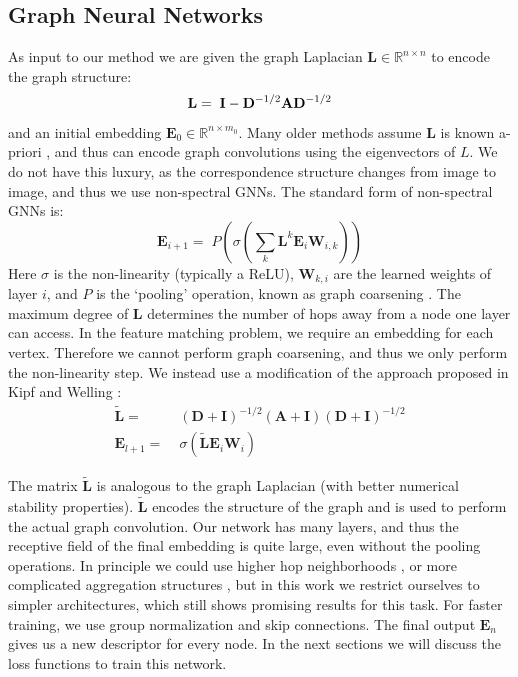\documentclass[10pt,twocolumn,letterpaper]{article}
\newcommand{\bR}{\mathbb{R}}
\newcommand{\mat}[1]{\mathbf{#1}}
\begin{document}
\subsection{Graph Neural Networks}
As input to our method we are given the graph Laplacian $\mat{L} \in \bR^{n \times n}$ to encode the graph structure:
\begin{equation}
  \mat{L} =\; \mat{I} - \mat{D}^{-1/2} \mat{A} \mat{D}^{-1/2} \\
\end{equation}
and an initial embedding $\mat{E}_0 \in \bR^{n \times m_0}$.
Many older methods assume $\mat{L}$ is known a-priori \cite{bruna2013spectral}, and thus can encode graph convolutions using the eigenvectors of $L$.
We do not have this luxury, as the correspondence structure changes from image to image, and thus we use non-spectral GNNs. The standard form of non-spectral GNNs is:
\begin{equation}
\mat{E}_{i+1} =\; P\left(\sigma\left( \sum_k \mat{L}^k \mat{E}_i \mat{W}_{i,k} \right)\right)
\end{equation}
Here $\sigma$ is the non-linearity (typically a ReLU), $\mat{W}_{k,i}$ are the learned weights of layer $i$,  and $P$ is the `pooling' operation, known as graph coarsening \cite{bronstein2017geometric, gama2018mimo}.
The maximum degree of $\mat{L}$ determines the number of hops away from a node one layer can access.
In the feature matching problem, we require an embedding for each vertex.
Therefore we cannot perform graph coarsening, and thus we only perform the non-linearity step.
We instead use a modification of the approach proposed in Kipf and Welling \cite{kipf2016semi}:
\begin{align}
      \widetilde{\mat{L}} =&\; (\mat{D} + \mat{I})^{-1/2} (\mat{A} + \mat{I}) (\mat{D} + \mat{I})^{-1/2} \\
\mat{E}_{l+1} =&\; \sigma\left(\widetilde{\mat{L}} \mat{E}_i \mat{W}_i \right)  \label{eq:graph_conv}
\end{align}

The matrix $\widetilde{\mat{L}}$ is analogous to the graph Laplacian (with better numerical stability properties).
$\widetilde{\mat{L}}$ encodes the structure of the graph and is used to perform the actual graph convolution.
Our network has many layers, and thus the receptive field of the final embedding is quite large, even without the pooling operations.
In principle we could use higher hop neighborhoods \cite{gama2018convolutional}, or more complicated aggregation structures \cite{battaglia2018relational}, but in this work we restrict ourselves to simpler architectures, which still shows promising results for this task.
For faster training, we use group normalization \cite{wu2018group} and skip connections.
The final output $\mat{E}_n$ gives us a new descriptor for every node.
In the next sections we will discuss the loss functions to train this network.
\end{document}

